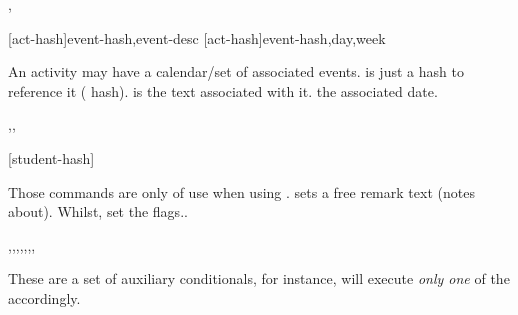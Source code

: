 \documentclass[article,nogeometry,english,tocdepth=3,secdepth=3]{ufrgscca} %
\begin{document}
\begin{codedescribe}[code,new=2023/11/18]{\ActivitySetNewEvent,\ActivitySetEventDay}
	\begin{codesyntax}%
    \tsmacro{\ActivitySetNewEvent}[act-hash]{event-hash,event-desc}
    \tsmacro{\ActivitySetEventDay}[act-hash]{event-hash,day,week}
	\end{codesyntax}
An activity may have a calendar/set of associated events.  is just a hash to reference it ( hash).  is the text associated with it.  the associated date.
\end{codedescribe}


\begin{codedescribe}[code,new=2023/11/18]{\studentremark,\studentnewpage,\distinctboard}
	\begin{codesyntax}%
		\tsmacro{\studentremark}{remarks}
		\tsmacro{\studentnewpage}[student-hash]{}
		\tsmacro{\distinctboard}{}
	\end{codesyntax}
Those commands are only of use when using . \tsmacro{\studentremark}{} sets a free remark text (notes about). Whilst, \tsobj{\distinctboard,\studentnewpage} set the  flags..
\end{codedescribe}


\begin{codedescribe}[code,new=2023/11/18,update=2023/12/02,update=2024/01/15,update=2024/02/22]{\studentCase,\studentAdvCase,\studentCoadvCase,\studentDismissCase,\studentNewPageCase,\studentDistinctBoardCase,\studentReviewerCase,\studentReviewerSetCase}
	\begin{codesyntax}%
	\end{codesyntax}
These are a set of auxiliary conditionals, for instance, \tsobj{\StudentCase} will execute \emph{only one} of the  accordingly.
\end{codedescribe}
\end{document}
